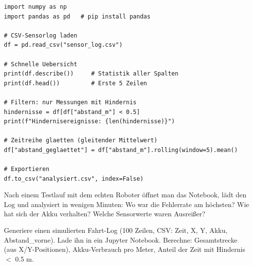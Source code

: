 \begin{lstlisting}
import numpy as np
import pandas as pd   # pip install pandas

# CSV-Sensorlog laden
df = pd.read_csv("sensor_log.csv")

# Schnelle Uebersicht
print(df.describe())     # Statistik aller Spalten
print(df.head())         # Erste 5 Zeilen

# Filtern: nur Messungen mit Hindernis
hindernisse = df[df["abstand_m"] < 0.5]
print(f"Hindernisereignisse: {len(hindernisse)}")

# Zeitreihe glaetten (gleitender Mittelwert)
df["abstand_geglaettet"] = df["abstand_m"].rolling(window=5).mean()

# Exportieren
df.to_csv("analysiert.csv", index=False)
\end{lstlisting}

\begin{praxis}
Nach einem Testlauf mit dem echten Roboter öffnet man das Notebook, lädt den Log und analysiert in wenigen Minuten: Wo war die Fehlerrate am höchsten? Wie hat sich der Akku verhalten? Welche Sensorwerte waren Ausreißer?
\end{praxis}

\begin{uebung}[title=Projektaufgabe Modul 12: Testfahrt-Analyse]
Generiere einen simulierten Fahrt-Log (100 Zeilen, CSV: Zeit, X, Y, Akku, Abstand\_vorne). Lade ihn in ein Jupyter Notebook. Berechne: Gesamtstrecke (aus X/Y-Positionen), Akku-Verbrauch pro Meter, Anteil der Zeit mit Hindernis $<$ 0.5 m.
\end{uebung}
